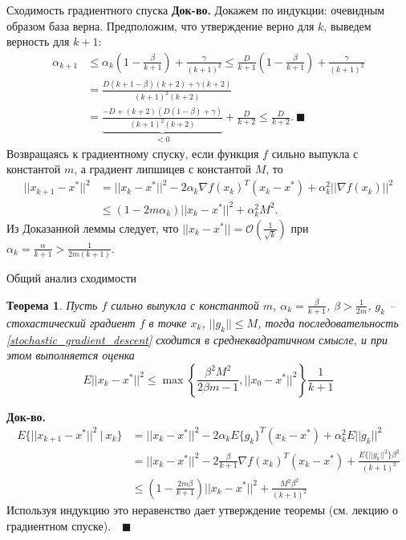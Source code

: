 \documentclass[10pt, handout]{beamer}
\newcounter{thm}
\newtheorem{theorem_ru}[thm]{Теорема}
\begin{document}
\begin{frame}{Сходимость градиентного спуска}
\textbf{Док-во.} Докажем по индукции: очевидным образом база верна. Предположим, что утверждение верно для $k$, выведем верность для $k+1$:
\begin{align*}
\alpha_{k+1}&\leq \alpha_k\left(1-\frac{\beta}{k+1}\right)+\frac{\gamma}{(k+1)^2}\leq \frac{D}{k+1}\left(1-\frac{\beta}{k+1}\right)+\frac{\gamma}{(k+1)^2}\\
&=\frac{D(k+1-\beta)(k+2)+\gamma(k+2)}{(k+1)^2(k+2)}\\
&=\underbrace{\frac{-D+(k+2)(D(1-\beta)+\gamma)}{(k+1)^2(k+2)}}_{<0}+\frac{D}{k+2}\leq \frac{D}{k+2}.~\blacksquare
\end{align*}
\pause
Возвращаясь к градиентному спуску, если функция $f$ сильно выпукла с константой $m$, а градиент липшицев с константой $M$, то
\begin{align*}
||x_{k+1}-x^*||^2&=||x_k-x^*||^2-2\alpha_k\nabla f(x_k)^T(x_k-x^*)+\alpha_k^2||\nabla f(x_k)||^2\\
&\leq \left(1-2m\alpha_k\right)||x_k-x^*||^2+\alpha_k^2M^2.
\end{align*}
\pause
Из Доказанной леммы следует, что $||x_k-x^*||=\mathcal{O}\left(\frac{1}{\sqrt{k}}\right)$ при $\alpha_k= \frac{\alpha}{k+1}>\frac{1}{2m(k+1)}$. 
\end{frame}


\begin{frame}{Общий анализ сходимости}
\begin{theorem_ru}
Пусть $f$ сильно выпукла с константой $m$, $\alpha_k=\frac{\beta}{k+1}$, $\beta>\frac{1}{2m}$, $g_k$ -- стохастический градиент $f$ в точке $x_k$, 
$||g_k||\leq M$, тогда последовательность \eqref{stochastic_gradient_descent} сходится в среднеквадратичном смысле, и при этом выполняется оценка
$$
E||x_k-x^*||^2\leq \max\left\{\frac{\beta^2M^2}{2\beta m-1}, ||x_0-x^*||^2\right\}\frac{1}{k+1}
$$
\end{theorem_ru}
\pause
\textbf{Док-во.}
\begin{align*}
E\{||x_{k+1}-x^*||^2~|~x_k\}&=||x_k-x^*||^2-2\alpha_kE\{g_k\}^T(x_k-x^*)+\alpha_k^2E||g_k||^2\\
&=||x_k-x^*||^2-2\frac{\beta}{k+1}\nabla f(x_k)^T(x_k-x^*)+\frac{E\{||g_k||^2\}\beta^2}{(k+1)^2}\\
&\leq \left(1-\frac{2m\beta}{k+1}\right)||x_k-x^*||^2+\frac{M^2\beta^2}{(k+1)^2}
\end{align*}
\pause
Используя индукцию это неравенство дает утверждение теоремы (см. лекцию о градиентном спуске).~~$\blacksquare$
\end{frame}
\end{document}
